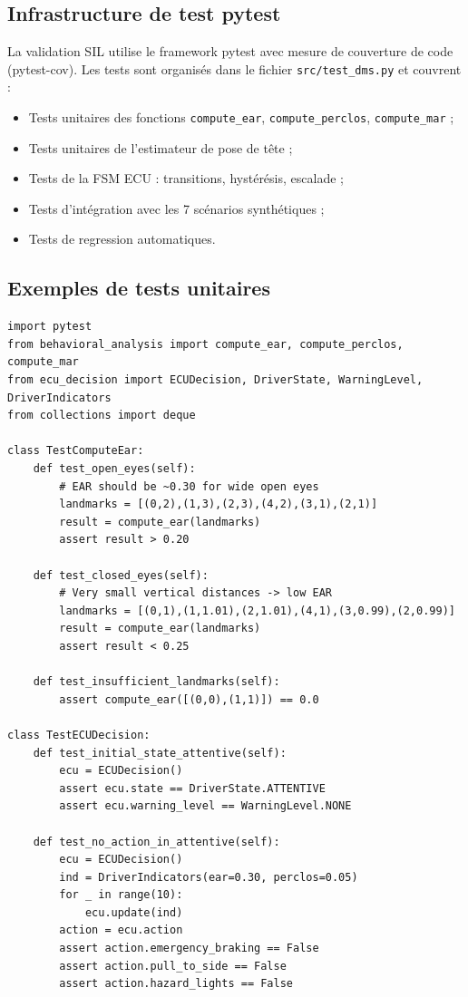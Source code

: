 \documentclass[12pt,a4paper]{report}
\begin{document}
\subsection{Infrastructure de test pytest}

La validation SIL utilise le framework pytest avec mesure de couverture de code (pytest-cov). Les tests sont organis\'es dans le fichier \texttt{src/test\_dms.py} et couvrent :

\begin{itemize}
  \item Tests unitaires des fonctions \texttt{compute\_ear}, \texttt{compute\_perclos}, \texttt{compute\_mar} ;
  \item Tests unitaires de l'estimateur de pose de t\^ete ;
  \item Tests de la FSM ECU : transitions, hyst\'er\'esis, escalade ;
  \item Tests d'int\'egration avec les 7 sc\'enarios synth\'etiques ;
  \item Tests de regression automatiques.
\end{itemize}

\subsection{Exemples de tests unitaires}

\begin{lstlisting}[style=python, caption={Tests unitaires SIL (test\_dms.py -- extraits)}, label=lst:test_sil]
import pytest
from behavioral_analysis import compute_ear, compute_perclos, compute_mar
from ecu_decision import ECUDecision, DriverState, WarningLevel, DriverIndicators
from collections import deque

class TestComputeEar:
    def test_open_eyes(self):
        # EAR should be ~0.30 for wide open eyes
        landmarks = [(0,2),(1,3),(2,3),(4,2),(3,1),(2,1)]
        result = compute_ear(landmarks)
        assert result > 0.20

    def test_closed_eyes(self):
        # Very small vertical distances -> low EAR
        landmarks = [(0,1),(1,1.01),(2,1.01),(4,1),(3,0.99),(2,0.99)]
        result = compute_ear(landmarks)
        assert result < 0.25

    def test_insufficient_landmarks(self):
        assert compute_ear([(0,0),(1,1)]) == 0.0

class TestECUDecision:
    def test_initial_state_attentive(self):
        ecu = ECUDecision()
        assert ecu.state == DriverState.ATTENTIVE
        assert ecu.warning_level == WarningLevel.NONE

    def test_no_action_in_attentive(self):
        ecu = ECUDecision()
        ind = DriverIndicators(ear=0.30, perclos=0.05)
        for _ in range(10):
            ecu.update(ind)
        action = ecu.action
        assert action.emergency_braking == False
        assert action.pull_to_side == False
        assert action.hazard_lights == False
\end{lstlisting}
\end{document}
